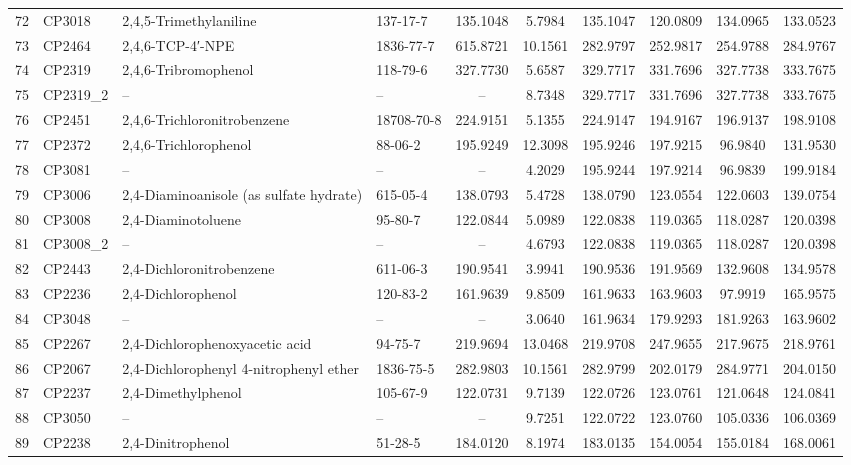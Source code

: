 \begin{longtable}{clllcccccc}
72 & CP3018 & 2,4,5-Trimethylaniline & 137-17-7 & 135.1048 & 5.7984 & 135.1047 & 120.0809 & 134.0965 & 133.0523 \\ 
73 & CP2464 & 2,4,6-TCP-4′-NPE & 1836-77-7 & 615.8721 & 10.1561 & 282.9797 & 252.9817 & 254.9788 & 284.9767 \\ 
74 & CP2319 & 2,4,6-Tribromophenol & 118-79-6 & 327.7730 & 5.6587 & 329.7717 & 331.7696 & 327.7738 & 333.7675 \\ 
75 & CP2319\_2 & – & – & – & 8.7348 & 329.7717 & 331.7696 & 327.7738 & 333.7675 \\ 
76 & CP2451 & 2,4,6-Trichloronitrobenzene & 18708-70-8 & 224.9151 & 5.1355 & 224.9147 & 194.9167 & 196.9137 & 198.9108 \\ 
77 & CP2372 & 2,4,6-Trichlorophenol & 88-06-2 & 195.9249 & 12.3098 & 195.9246 & 197.9215 & 96.9840 & 131.9530 \\ 
78 & CP3081 & – & – & – & 4.2029 & 195.9244 & 197.9214 & 96.9839 & 199.9184 \\ 
79 & CP3006 & 2,4-Diaminoanisole (as sulfate hydrate) & 615-05-4 & 138.0793 & 5.4728 & 138.0790 & 123.0554 & 122.0603 & 139.0754 \\ 
80 & CP3008 & 2,4-Diaminotoluene & 95-80-7 & 122.0844 & 5.0989 & 122.0838 & 119.0365 & 118.0287 & 120.0398 \\ 
81 & CP3008\_2 & – & – & – & 4.6793 & 122.0838 & 119.0365 & 118.0287 & 120.0398 \\ 
82 & CP2443 & 2,4-Dichloronitrobenzene & 611-06-3 & 190.9541 & 3.9941 & 190.9536 & 191.9569 & 132.9608 & 134.9578 \\ 
83 & CP2236 & 2,4-Dichlorophenol & 120-83-2 & 161.9639 & 9.8509 & 161.9633 & 163.9603 & 97.9919 & 165.9575 \\ 
84 & CP3048 & – & – & – & 3.0640 & 161.9634 & 179.9293 & 181.9263 & 163.9602 \\ 
85 & CP2267 & 2,4-Dichlorophenoxyacetic acid & 94-75-7 & 219.9694 & 13.0468 & 219.9708 & 247.9655 & 217.9675 & 218.9761 \\ 
86 & CP2067 & 2,4-Dichlorophenyl 4-nitrophenyl ether & 1836-75-5 & 282.9803 & 10.1561 & 282.9799 & 202.0179 & 284.9771 & 204.0150 \\ 
87 & CP2237 & 2,4-Dimethylphenol\smash{\textsuperscript{\textdaggerdbl}} & 105-67-9 & 122.0731 & 9.7139 & 122.0726 & 123.0761 & 121.0648 & 124.0841 \\ 
88 & CP3050 & – & – & – & 9.7251 & 122.0722 & 123.0760 & 105.0336 & 106.0369 \\ 
89 & CP2238 & 2,4-Dinitrophenol & 51-28-5 & 184.0120 & 8.1974 & 183.0135 & 154.0054 & 155.0184 & 168.0061 \\ 

\end{longtable}

